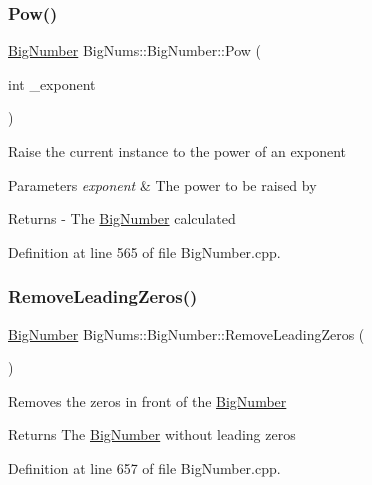 \subsubsection{\texorpdfstring{Pow()}{Pow()}}
{\footnotesize\ttfamily \mbox{\hyperlink{class_big_nums_1_1_big_number}{Big\+Number}} Big\+Nums\+::\+Big\+Number\+::\+Pow (\begin{DoxyParamCaption}\item[{int}]{\+\_\+exponent }\end{DoxyParamCaption})}

Raise the current instance to the power of an exponent 
\begin{DoxyParams}{Parameters}
{\em exponent} & The power to be raised by \\
\hline
\end{DoxyParams}
\begin{DoxyReturn}{Returns}
-\/ The \mbox{\hyperlink{class_big_nums_1_1_big_number}{Big\+Number}} calculated 
\end{DoxyReturn}


Definition at line 565 of file Big\+Number.\+cpp.

\mbox{\label{class_big_nums_1_1_big_number_a440be0c0feaf4be408ed8f7fa6b42926}} 
\subsubsection{\texorpdfstring{RemoveLeadingZeros()}{RemoveLeadingZeros()}}
{\footnotesize\ttfamily \mbox{\hyperlink{class_big_nums_1_1_big_number}{Big\+Number}} Big\+Nums\+::\+Big\+Number\+::\+Remove\+Leading\+Zeros (\begin{DoxyParamCaption}{ }\end{DoxyParamCaption})}

Removes the zeros in front of the \mbox{\hyperlink{class_big_nums_1_1_big_number}{Big\+Number}} \begin{DoxyReturn}{Returns}
The \mbox{\hyperlink{class_big_nums_1_1_big_number}{Big\+Number}} without leading zeros 
\end{DoxyReturn}


Definition at line 657 of file Big\+Number.\+cpp.

\mbox{\label{class_big_nums_1_1_big_number_a7e47aaceaeacdfa5685158daa230dbfd}} 
